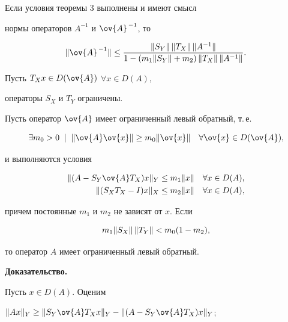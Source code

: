\begin{cornonum}


Если условия теоремы 3 выполнены и имеют смысл


нормы операторов $A^{-1}$ и $\ov{A}^{\,-1}$, то


$$


\nr{\ov{A}^{\,-1}} \le \frac{\nr{S_Y}\,\nr{T_X}\,\nr{A^{-1}}}


{1-(m_1\nr{S_Y}+m_2)\,\nr{T_X}\,\nr{A^{-1}}}.


$$


\end{cornonum}





\begin{thm}


Пусть $T_Xx\in D(\ov{A})$ $\forall x\in D(A)$,


операторы $S_X$ и $T_Y$ ограничены.


Пусть оператор $\ov{A}$ имеет ограниченный левый обратный, т.\,е.


$$


\exists m_0 >0 \;\mid\;


\nr{\ov{A}\ov{x}}\ge m_0\nr{\ov{x}}\quad \forall \ov{x}\in D(\ov{A}),


$$


и выполняются условия


\begin{align*}


\nr{(A-S_Y\ov{A} T_X)x}_Y &\le m_1\nr{x}\quad \forall x\in D(A), \\


%


\nr{(S_XT_X-I)x}_X &\le m_2\nr{x}\quad \forall x\in D(A),


\end{align*}


причем постоянные $m_1$ и $m_2$ не зависят от $x$. Если


$$


m_1\nr{S_X}\,\nr{T_Y} < m_0(1-m_2),


$$


то оператор $A$ имеет ограниченный левый обратный.


\end{thm}





{\bf Доказательство.}


Пусть $x\in D(A)$. Оценим


$\nr{Ax}_Y\ge\nr{S_Y\ov{A} T_Xx}_Y - \nr{(A-S_Y\ov{A} T_X)x}_Y$;


